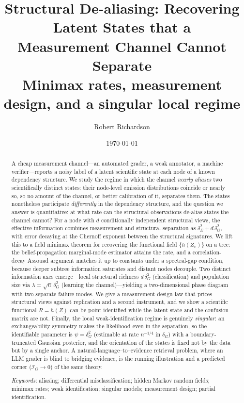 \documentclass[11pt]{article}
\title{\textbf{Structural De-aliasing: Recovering Latent States that a\\ Measurement Channel Cannot Separate}\\[4pt]
\large Minimax rates, measurement design, and a singular local regime}
\author{Robert Richardson}
\date{\today}
\theoremstyle{plain}
\theoremstyle{definition}\newtheorem{definition}{Definition}\newtheorem{assumption}{Assumption}
\begin{document}
\maketitle

\begin{abstract}
A cheap measurement channel---an automated grader, a weak annotator, a machine verifier---reports a noisy label of
a latent scientific state at each node of a known dependency structure. We study the regime in which the channel
\emph{nearly aliases} two scientifically distinct states: their node-level emission distributions coincide or
nearly so, so no amount of the channel, or better calibration of it, separates them. The states nonetheless
participate \emph{differently} in the dependency structure, and the question we answer is quantitative: at what
rate can the structural observations de-alias states the channel cannot? For a node with $d$ conditionally
independent structural views, the effective information combines measurement and structural separation as
$\delta_E^2+d\,\delta_G^2$, with error decaying at the Chernoff exponent between the structural signatures. We lift
this to a field minimax theorem for recovering the functional field $\{h(Z_v)\}$ on a tree: the belief-propagation
marginal-mode estimator attains the rate, and a correlation-decay Assouad argument matches it up to constants
under a spectral-gap condition, because deeper subtree information saturates and distant nodes decouple. Two
distinct information axes emerge---local structural richness $d\,\delta_G^2$ (classification) and population size
via $\lambda=\sqrt n\,\delta_G^2$ (learning the channel)---yielding a two-dimensional phase diagram with two
separate failure modes. We give a measurement-design law that prices structural views against replication and a
second instrument, and we show a scientific functional $R=h(Z)$ can be point-identified while the latent state and
the confusion matrix are not. Finally, the local weak-identification regime is genuinely \emph{singular}: an
exchangeability symmetry makes the likelihood even in the separation, so the identifiable parameter is
$\psi=\delta_G^2$ (estimable at rate $n^{-1/4}$ in $\delta_G$) with a boundary-truncated Gaussian posterior, and
the orientation of the states is fixed not by the data but by a single anchor. A natural-language--to--evidence
retrieval problem, where an LLM grader is blind to bridging evidence, is the running illustration and a predicted
corner ($\mathcal I_G\!\to\!0$) of the same theory.

\smallskip\noindent\emph{Keywords:} aliasing; differential misclassification; hidden Markov random fields;
minimax rates; weak identification; singular models; measurement design; partial identification.
\end{abstract}
\end{document}
